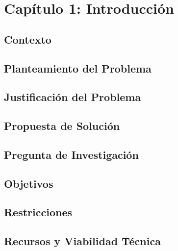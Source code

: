 \section{Capítulo 1: Introducción}

\subsection{Contexto}


\subsection{Planteamiento del Problema}


\subsection{Justificación del Problema}


\subsection{Propuesta de Solución}


\subsection{Pregunta de Investigación}


\subsection{Objetivos}




\subsection{Restricciones}


\subsection{Recursos y Viabilidad Técnica}

